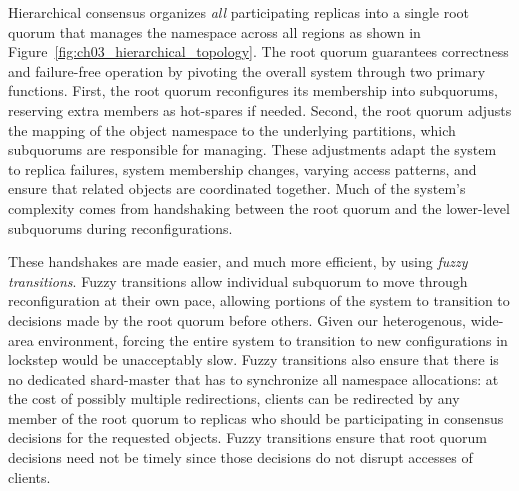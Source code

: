 Hierarchical consensus organizes \emph{all} participating replicas into a single root quorum that manages the namespace across all regions as shown in Figure~\ref{fig:ch03_hierarchical_topology}.
The root quorum guarantees correctness and failure-free operation by pivoting the overall system through two primary functions.
First, the root quorum reconfigures its membership into subquorums, reserving extra members as hot-spares if needed.
Second, the root quorum adjusts the mapping of the object namespace to the underlying partitions, which subquorums are responsible for managing.
These adjustments adapt the system to replica failures, system membership changes, varying access patterns, and ensure that related objects are coordinated together.
Much of the system's complexity comes from handshaking between the root quorum and the lower-level subquorums during reconfigurations.


These handshakes are made easier, and much more efficient, by using \emph{fuzzy transitions}.
Fuzzy transitions allow individual subquorum to move through reconfiguration at their own pace, allowing portions of the system to transition to decisions made by the root quorum before others.
Given our heterogenous, wide-area environment, forcing the entire system to transition to new configurations in lockstep would be unacceptably slow.
Fuzzy transitions also ensure that there is no dedicated shard-master that has to synchronize all namespace allocations: at the cost of possibly multiple  redirections, clients can be redirected by any member of the root quorum to replicas who should be participating in consensus decisions for the requested objects.
Fuzzy transitions ensure that root quorum decisions need not be timely since those decisions do not disrupt accesses of clients.


